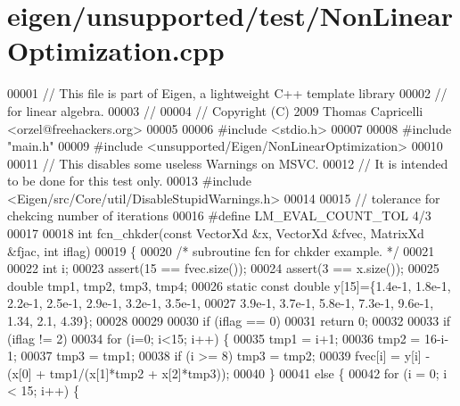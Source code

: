\hypertarget{eigen_2unsupported_2test_2_non_linear_optimization_8cpp_source}{}\section{eigen/unsupported/test/\+Non\+Linear\+Optimization.cpp}
\label{eigen_2unsupported_2test_2_non_linear_optimization_8cpp_source}

\begin{DoxyCode}
00001 \textcolor{comment}{// This file is part of Eigen, a lightweight C++ template library}
00002 \textcolor{comment}{// for linear algebra.}
00003 \textcolor{comment}{//}
00004 \textcolor{comment}{// Copyright (C) 2009 Thomas Capricelli <orzel@freehackers.org>}
00005 
00006 \textcolor{preprocessor}{#include <stdio.h>}
00007 
00008 \textcolor{preprocessor}{#include "main.h"}
00009 \textcolor{preprocessor}{#include <unsupported/Eigen/NonLinearOptimization>}
00010 
00011 \textcolor{comment}{// This disables some useless Warnings on MSVC.}
00012 \textcolor{comment}{// It is intended to be done for this test only.}
00013 \textcolor{preprocessor}{#include <Eigen/src/Core/util/DisableStupidWarnings.h>}
00014 
00015 \textcolor{comment}{// tolerance for chekcing number of iterations}
00016 \textcolor{preprocessor}{#define LM\_EVAL\_COUNT\_TOL 4/3}
00017 
00018 \textcolor{keywordtype}{int} fcn\_chkder(\textcolor{keyword}{const} VectorXd &x, VectorXd &fvec, MatrixXd &fjac, \textcolor{keywordtype}{int} iflag)
00019 \{
00020     \textcolor{comment}{/*      subroutine fcn for chkder example. */}
00021 
00022     \textcolor{keywordtype}{int} i;
00023     assert(15 ==  fvec.size());
00024     assert(3 ==  x.size());
00025     \textcolor{keywordtype}{double} tmp1, tmp2, tmp3, tmp4;
00026     \textcolor{keyword}{static} \textcolor{keyword}{const} \textcolor{keywordtype}{double} y[15]=\{1.4e-1, 1.8e-1, 2.2e-1, 2.5e-1, 2.9e-1, 3.2e-1, 3.5e-1,
00027         3.9e-1, 3.7e-1, 5.8e-1, 7.3e-1, 9.6e-1, 1.34, 2.1, 4.39\};
00028 
00029 
00030     \textcolor{keywordflow}{if} (iflag == 0)
00031         \textcolor{keywordflow}{return} 0;
00032 
00033     \textcolor{keywordflow}{if} (iflag != 2)
00034         \textcolor{keywordflow}{for} (i=0; i<15; i++) \{
00035             tmp1 = i+1;
00036             tmp2 = 16-i-1;
00037             tmp3 = tmp1;
00038             \textcolor{keywordflow}{if} (i >= 8) tmp3 = tmp2;
00039             fvec[i] = y[i] - (x[0] + tmp1/(x[1]*tmp2 + x[2]*tmp3));
00040         \}
00041     \textcolor{keywordflow}{else} \{
00042         \textcolor{keywordflow}{for} (i = 0; i < 15; i++) \{

\end{DoxyCode}
